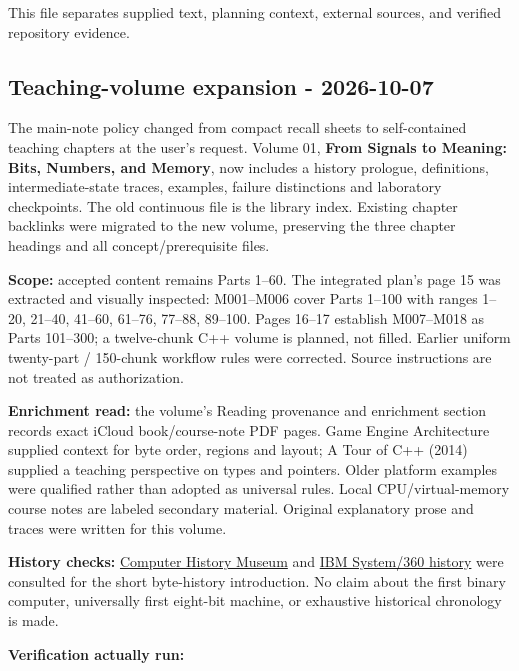 This file separates supplied text, planning context, external sources, and verified repository evidence.

\subsection{Teaching-volume expansion - 2026-10-07}\label{appendix-a103e7846d21-teaching-volume-expansion---2026-10-07}

The main-note policy changed from compact recall sheets to self-contained teaching chapters at the user's request. Volume 01, \textbf{From Signals to Meaning: Bits, Numbers, and Memory}, now includes a history prologue, definitions, intermediate-state traces, examples, failure distinctions and laboratory checkpoints. The old continuous file is the library index. Existing chapter backlinks were migrated to the new volume, preserving the three chapter headings and all concept/prerequisite files.

\textbf{Scope:} accepted content remains Parts 1--60. The integrated plan's page 15 was extracted and visually inspected: M001--M006 cover Parts 1--100 with ranges 1--20, 21--40, 41--60, 61--76, 77--88, 89--100. Pages 16--17 establish M007--M018 as Parts 101--300; a twelve-chunk C++ volume is planned, not filled. Earlier uniform twenty-part / 150-chunk workflow rules were corrected. Source instructions are not treated as authorization.

\textbf{Enrichment read:} the volume's Reading provenance and enrichment section records exact iCloud book/course-note PDF pages. Game Engine Architecture supplied context for byte order, regions and layout; A Tour of C++ (2014) supplied a teaching perspective on types and pointers. Older platform examples were qualified rather than adopted as universal rules. Local CPU/virtual-memory course notes are labeled secondary material. Original explanatory prose and traces were written for this volume.

\textbf{History checks:} \href{https://www.computerhistory.org/tdih/october/24/}{Computer History Museum} and \href{https://www.ibm.com/history/system-360}{IBM System/360 history} were consulted for the short byte-history introduction. No claim about the first binary computer, universally first eight-bit machine, or exhaustive historical chronology is made.

\textbf{Verification actually run:}

